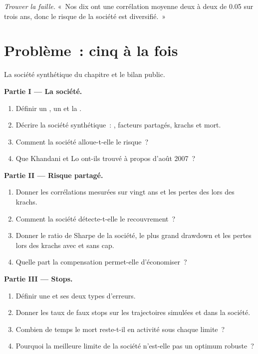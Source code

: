 \begin{exercise}[$\star\star\star$]\label{exo:s1:running-a-multi-strategy-book:8}
\emph{Trouver la faille.} «~Nos dix  ont une corrélation moyenne deux à deux de 0.05 sur trois ans, donc le risque de la société est diversifié.~»
\end{exercise}

\section{Problème~: cinq à la fois}

\begin{problem}\label{pb:s1:running-a-multi-strategy-book:1}
La société synthétique du chapitre et le bilan public.

\medskip\noindent\textbf{Partie I --- La société.}
\begin{enumerate}
\item Définir un , un  et la .
\item Décrire la société synthétique~: , facteurs partagés, krachs et  mort.
\item Comment la société alloue-t-elle le risque~?
\item Que Khandani et Lo ont-ils trouvé à propos d'août 2007~?
\end{enumerate}

\medskip\noindent\textbf{Partie II --- Risque partagé.}
\begin{enumerate}[resume]
\item Donner les corrélations mesurées sur vingt ans et les pertes des  lors des krachs.
\item Comment la société détecte-t-elle le recouvrement~?
\item Donner le ratio de Sharpe de la société, le plus grand drawdown et les pertes lors des krachs avec et sans cap.
\item Quelle part la compensation permet-elle d'économiser~?
\end{enumerate}

\medskip\noindent\textbf{Partie III --- Stops.}
\begin{enumerate}[resume]
\item Définir une  et ses deux types d'erreurs.
\item Donner les taux de faux stops sur les trajectoires simulées et dans la société.
\item Combien de temps le  mort reste-t-il en activité sous chaque limite~?
\item Pourquoi la meilleure limite de la société n'est-elle pas un optimum robuste~?
\end{enumerate}


\end{problem}

